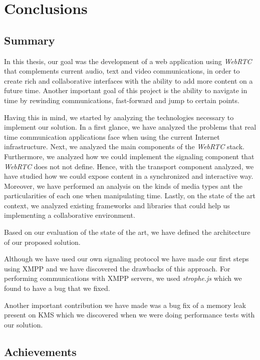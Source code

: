 \chapter{Conclusions}
\label{chapter:conclusion}

\section{Summary}
\label{section:summary}
In this thesis, our goal was the development of a web application using \emph{WebRTC} that complements current audio, text and video communications, in order to create rich and collaborative interfaces with the ability to add more content on a future time. Another important goal of this project is the ability to navigate in time by rewinding communications, fast-forward and jump to certain points.

Having this in mind, we started by analyzing the technologies necessary to implement our solution. In a first glance, we have analyzed the problems that real time communication applications face when using the current Internet infrastructure. Next, we analyzed the main components of the \emph{WebRTC} stack. Furthermore, we analyzed how we could implement the signaling component that \emph{WebRTC} does not not define. Hence, with the transport component analyzed, we have studied how we could expose content in a synchronized and interactive way. Moreover, we have performed an analysis on the kinds of media types ant the particularities of each one when manipulating time. Lastly, on the state of the art context, we analyzed existing frameworks and libraries that could help us implementing a collaborative environment.

Based on our evaluation of the state of the art, we have defined the architecture of our proposed solution.

Although we have used our own signaling protocol we have made our first steps using \ac{XMPP} and we have discovered the drawbacks of this approach. For performing communications with \ac{XMPP} servers, we used \emph{strophe.js} which we found to have a bug that we fixed.

Another important contribution we have made was a bug fix of a memory leak present on \ac{KMS} which we discovered when we were doing performance tests with our solution.

\section{Achievements}
\label{section:achievements}

